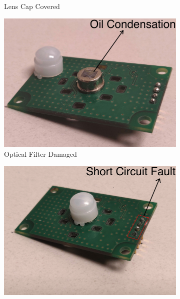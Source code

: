 \documentclass[manuscript,screen,review]{acmart} %
\providecommand{\DIFadd}[1]{{\protect\color{blue}\uwave{#1}}} %
\providecommand{\DIFaddFL}[1]{\DIFadd{#1}} %
\providecommand{\DIFaddbeginFL}{} %
\providecommand{\DIFaddendFL}{} %
\providecommand{\DIFdelbeginFL}{} %
\providecommand{\DIFdelendFL}{} %
\newcommand{\DIFscaledelfig}{0.5}
\newlength{\DIFdelgraphicswidth} %
\newlength{\DIFdelgraphicsheight} %
\newcommand{\DIFaddincludegraphics}[2][]{{\color{blue}\fbox{\DIFOincludegraphics[#1]{#2}}}} %
\newcommand{\DIFdelincludegraphics}[2][]{%
\sbox{\DIFdelgraphicsbox}{\DIFOincludegraphics[#1]{#2}}%
\settoboxwidth{\DIFdelgraphicswidth}{\DIFdelgraphicsbox} %
\settoboxtotalheight{\DIFdelgraphicsheight}{\DIFdelgraphicsbox} %
\scalebox{\DIFscaledelfig}{%
\parbox[b]{\DIFdelgraphicswidth}{\usebox{\DIFdelgraphicsbox}\\[-\baselineskip] \rule{\DIFdelgraphicswidth}{0em}}\llap{\resizebox{\DIFdelgraphicswidth}{\DIFdelgraphicsheight}{%
\setlength{\unitlength}{\DIFdelgraphicswidth}%
\begin{picture}(1,1)%
\thicklines\linethickness{2pt} %
{\color[rgb]{1,0,0}\put(0,0){\framebox(1,1){}}}%
{\color[rgb]{1,0,0}\put(0,0){\line( 1,1){1}}}%
{\color[rgb]{1,0,0}\put(0,1){\line(1,-1){1}}}%
\end{picture}%
}\hspace*{3pt}}} %
} %
\DeclareRobustCommand{\DIFaddbeginFL}{\DIFOaddbeginFL \let\includegraphics\DIFaddincludegraphics} %
\DeclareRobustCommand{\DIFaddendFL}{\DIFOaddendFL \let\includegraphics\DIFOincludegraphics} %
\DeclareRobustCommand{\DIFdelbeginFL}{\DIFOdelbeginFL \let\includegraphics\DIFdelincludegraphics} %
\DeclareRobustCommand{\DIFdelendFL}{\DIFOaddendFL \let\includegraphics\DIFOincludegraphics} %
\begin{document}
\begin{figure}
\begin{subfigure}[t]{0.24\textwidth}
		\caption{\footnotesize Lens Cap Covered}
		\label{fig:failure_photo5}
	\end{subfigure}
	\hspace{0.1ex}\DIFdelbeginFL %
\DIFdelendFL \DIFaddbeginFL \begin{subfigure}[t]{0.24\textwidth}
		\DIFaddendFL \centering
		\includegraphics[width=\textwidth]{figures/platform/failure_photographs/ClassIV-OpticalFilterDamage-annotated-jpg.jpg}
		\caption{\footnotesize Optical Filter Damaged}
		\label{fig:failure_photo6}
	\end{subfigure}	
	\DIFdelbeginFL %
\DIFdelendFL \DIFaddbeginFL \DIFaddFL{\hspace{0.1ex}
	}\begin{subfigure}[t]{0.24\textwidth}
		\centering
		\includegraphics[width=\textwidth]{figures/platform/failure_photographs/ClassV-ElectronicsFault-annotated-jpg.jpg}

\end{subfigure}
\end{figure}
\end{document}
